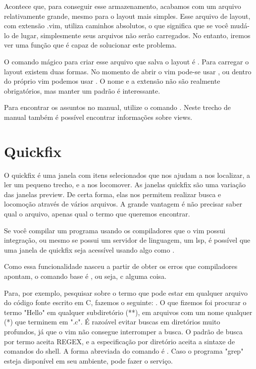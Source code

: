 Acontece que, para conseguir esse armazenamento, acabamos com um arquivo relativamente grande,
mesmo para o layout mais simples.
Esse arquivo de layout, com extensão .vim, utiliza caminhos absolutos,
o que significa que se você mudá-lo de lugar, simplesmente seus arquivos não serão carregados.
No entanto, iremos ver uma função que é capaz de solucionar este problema.

O comando mágico para criar esse arquivo que salva o layout é .
Para carregar o layout existem duas formas.
No momento de abrir o vim pode-se usar , ou dentro do próprio vim
podemos usar .
O nome e a extensão não são realmente obrigatórios, mas manter um padrão é interessante.

Para encontrar os assuntos no manual, utilize o comando .
Neste trecho de manual também é possível encontrar informações sobre views.

\section{Quickfix}
O quickfix é uma janela com itens selecionados que nos ajudam a nos localizar, a ler um pequeno trecho, e a nos locomover.
As janelas quickfix são uma variação das janelas preview.
De certa forma, elas nos permitem realizar busca e locomoção através de vários arquivos.
A grande vantagem é não precisar saber qual o arquivo, apenas qual o termo que queremos encontrar.

Se você compilar um programa usando os compiladores que o vim possui integração, ou mesmo se possui um servidor de linguagem,
um lsp, é possível que uma janela de quickfix seja acessível usando algo como .

Como essa funcionalidade nasceu a partir de obter os erros que compiladores apontam, o comando base é , ou seja,
c alguma coisa.

Para, por exemplo, pesquisar sobre o termo  que pode estar em qualquer
arquivo do código fonte escrito em C, fazemos o seguinte: .
O que fizemos foi procurar o termo "Hello" em qualquer subdiretório (**), em arquivos com um nome qualquer (*)
que terminem em ".c".
É razoável evitar buscas em diretórios muito profundos, já que o vim não consegue interromper a busca.
O padrão de busca por termo aceita REGEX, e a especificação por diretório aceita a sintaxe de comandos do shell.
A forma abreviada do comando  é .
Caso o programa "grep" esteja disponível em seu ambiente,  pode fazer o serviço.

